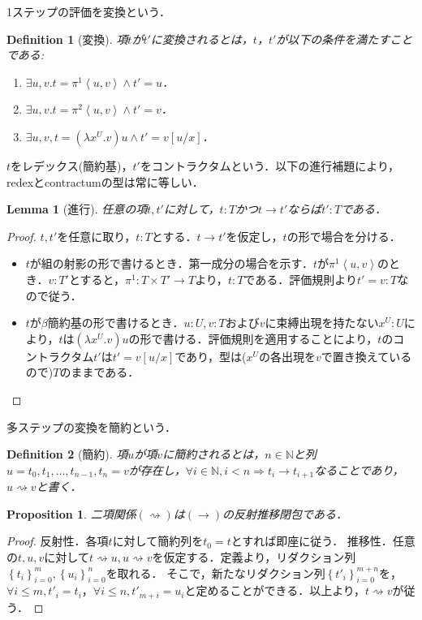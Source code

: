 \documentclass[a4paper,10pt,platex, dvipdfmx]{jsarticle}
\newtheorem{definition}{Definition}
\newtheorem{lemma}{Lemma}
\newtheorem{proposition}{Proposition}
\begin{document}
1ステップの評価を変換という．
\begin{definition}[変換]
項$t$が$t'$に変換されるとは，$t$，$t'$が以下の条件を満たすことである:\begin{enumerate}
\item $\exists u, v. t = \pi^{1}\left<u, v\right>\land t' = u$．
\item $\exists u, v. t = \pi^{2}\left<u, v\right>\land t' = v$．
\item $\exists u, v, t = (\lambda x^{U}.v) u \land t' = v\left[u/x\right]$．
\end{enumerate}
\end{definition}
$t$をレデックス(簡約基)，$t'$をコントラクタムという．以下の進行補題により，redexとcontractumの型は常に等しい．
\begin{lemma}[進行]
    任意の項$t, t'$に対して，$t: T$かつ$t\rightarrow t'$ならば$t' : T$である．
\end{lemma}
\begin{proof}
$t, t'$を任意に取り，$t:T$とする．$t\rightarrow t'$を仮定し，$t$の形で場合を分ける．
\begin{itemize}
    \item $t$が組の射影の形で書けるとき．第一成分の場合を示す．$t$が$\pi^{1}\left<u, v\right>$のとき．$v:T'$とすると，$\pi^{1}: T\times T'\rightarrow T$より，$t : T$である．評価規則より$t' = v : T$なので従う．
    \item $t$が$\beta$簡約基の形で書けるとき．$u: U, v: T$および$v$に束縛出現を持たない$x^{U}:U$により，$t$は$(\lambda x^{U}. v)u$の形で書ける．評価規則を適用することにより，$t$のコントラクタム$t'$は$t' = v\left[u/x\right]$であり，型は($x^{U}$の各出現を$v$で置き換えているので)$T$のままである．
\end{itemize}
\end{proof}
多ステップの変換を簡約という．
\begin{definition}[簡約]
項$u$が項$v$に簡約されるとは，$n\in\mathbb{N}$と列$u = t_{0}, t_{1},\ldots, t_{n- 1}, t_{n} = v$が存在し，$\forall i\in\mathbb{N}, i < n \Rightarrow t_{i}\rightarrow t_{i + 1}$なることであり，$u\rightsquigarrow v$と書く．
\end{definition}
\begin{proposition}
    二項関係$(\rightsquigarrow)$は$(\rightarrow)$の反射推移閉包である．
\end{proposition}
\begin{proof}
    反射性．各項$t$に対して簡約列を$t_{0} = t$とすれば即座に従う．
    推移性．任意の$t, u, v$に対して$t\rightsquigarrow u, u\rightsquigarrow v$を仮定する．定義より，リダクション列$\left\{t_{i}\right\}_{i = 0}^{m}, \left\{u_{i}\right\}_{i = 0}^{n}$を取れる．
    そこで，新たなリダクション列$\left\{t'_{i}\right\}_{i = 0}^{m+n}$を，$\forall i \leq m, t'_{i} = t_{i}$，$\forall i \leq n, t'_{m + i} = u_{i}$と定めることができる．以上より，$t\rightsquigarrow v$が従う．
\end{proof}
\end{document}
